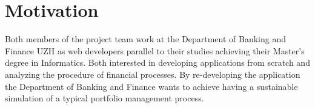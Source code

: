\section{Motivation}
Both members of the project team work at the Department of Banking and Finance UZH as web developers parallel to their studies achieving their Master’s degree in Informatics. Both interested in developing applications from scratch and analyzing the procedure of financial processes. By re-developing the application the Department of Banking and Finance wants to achieve having a sustainable simulation of a typical portfolio management process.
